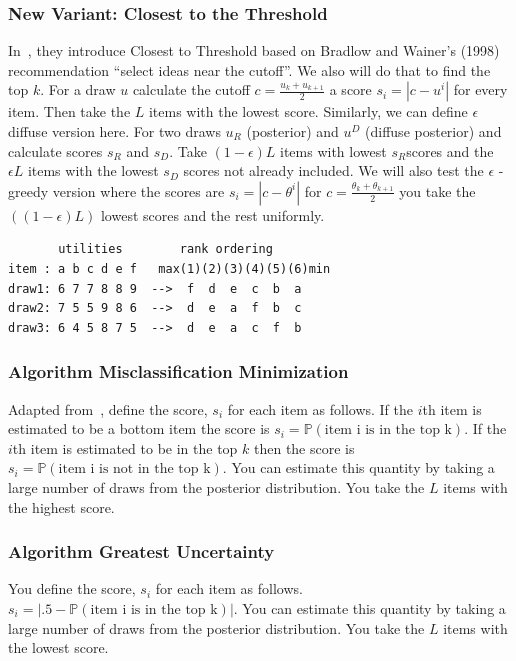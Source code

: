 \documentclass[a4paper,12pt]{article}
\newcommand{\numperset}{L}
\begin{document}
\subsubsection{New Variant: Closest to the Threshold}

In~\cite{toubia2007adaptive}, they introduce Closest to Threshold based on Bradlow and Wainer’s (1998) recommendation
``select ideas near the cutoff''. We also will do that to find the top $k$. For a draw $u$ calculate the cutoff $c=\frac{u_k+u_{k+1}}{2}$ a score $s_i=|c-u^i|$ for every item. Then take the $\numperset$ items with the lowest score. Similarly, we can define $\epsilon$ diffuse version here. For two draws $u_R$ (posterior) and $u^D$ (diffuse posterior) and calculate scores $s_R$ and $s_D$. Take $(1- \epsilon)L$ items with lowest $s_R$scores and the $\epsilon L$ items with the lowest $s_D$ scores not already included. We will also test the $\epsilon$ - greedy version where the scores are $s_i=|c-\theta^i|$ for $c=\frac{\theta_k+\theta_{k+1}}{2}$ you take the $((1-\epsilon)L)$ lowest scores and the rest uniformly.

\begin{verbatim}
       utilities        rank ordering
item : a b c d e f   max(1)(2)(3)(4)(5)(6)min
draw1: 6 7 7 8 8 9  -->  f  d  e  c  b  a   
draw2: 7 5 5 9 8 6  -->  d  e  a  f  b  c 
draw3: 6 4 5 8 7 5  -->  d  e  a  c  f  b 
\end{verbatim}

\subsubsection{Algorithm Misclassification Minimization}
Adapted from~\cite{toubia2007adaptive}, define the score, $s_i$ for each item as follows. If the $i$th item is estimated to be a bottom item the score is $s_i=\mathbb{P}(\text{item i is in the top k})$. If the $i$th  item is estimated to be in the top $k$ then the score is $s_i=\mathbb{P}(\text{item i is not in the top k})$. You can estimate this quantity by taking a large number of draws from the posterior distribution. You take the $\numperset$ items with the highest score.

\subsubsection{Algorithm Greatest Uncertainty}
You define the score, $s_i$ for each item as follows. $s_i=|.5-\mathbb{P}(\text{item i is in the top k})|$. You can estimate this quantity by taking a large number of draws from the posterior distribution. You take the $\numperset$ items with the lowest score.
\end{document}
